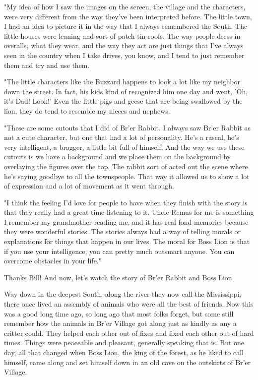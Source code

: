 "My idea of how I saw the images on the screen, the village and the characters, were very different from the way they've been interpreted before. The little town, I had an idea to picture it in the way that I always remembered the South. The little houses were leaning and sort of patch tin roofs. The way people dress in overalls, what they wear, and the way they act are just things that I've always seen in the country when I take drives, you know, and I tend to just remember them and try and use them.

"The little characters like the Buzzard happens to look a lot like my neighbor down the street. In fact, his kids kind of recognized him one day and went, 'Oh, it's Dad! Look!' Even the little pigs and geese that are being swallowed by the lion, they do tend to resemble my nieces and nephews.

"These are some cutouts that I did of Br'er Rabbit. I always saw Br'er Rabbit as not a cute character, but one that had a lot of personality. He's a rascal, he's very intelligent, a bragger, a little bit full of himself. And the way we use these cutouts is we have a background and we place them on the background by overlaying the figures over the top. The rabbit sort of acted out the scene where he's saying goodbye to all the townspeople. That way it allowed us to show a lot of expression and a lot of movement as it went through.

"I think the feeling I'd love for people to have when they finish with the story is that they really had a great time listening to it. Uncle Remus for me is something I remember my grandmother reading me, and it has real fond memories because they were wonderful stories. The stories always had a way of telling morals or explanations for things that happen in our lives. The moral for Boss Lion is that if you use your intelligence, you can pretty much outsmart anyone. You can overcome obstacles in your life."

Thanks Bill! And now, let's watch the story of Br'er Rabbit and Boss Lion.

Way down in the deepest South, along the river they now call the Mississippi, there once lived an assembly of animals who were all the best of friends. Now this was a good long time ago, so long ago that most folks forget, but some still remember how the animals in Br'er Village got along just as kindly as any a critter could. They helped each other out of fixes and fixed each other out of hard times. Things were peaceable and pleasant, generally speaking that is. But one day, all that changed when Boss Lion, the king of the forest, as he liked to call himself, came along and set himself down in an old cave on the outskirts of Br'er Village.


